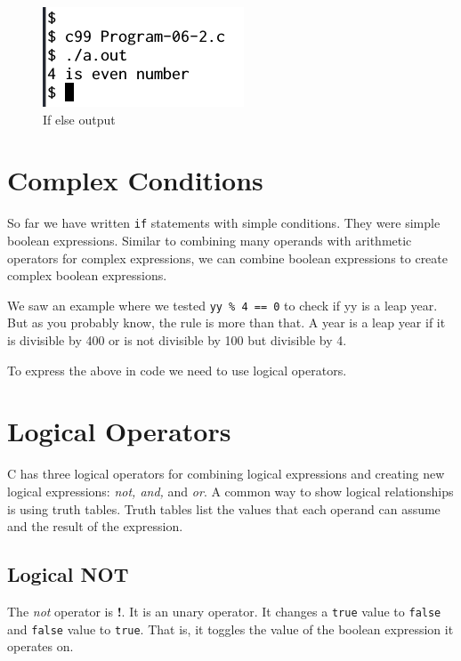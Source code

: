 \documentclass[11pt,a4paper]{article}
\begin{document}


\begin{figure}[ht]
\begin{center}
\includegraphics[scale = 0.6]{Output-06-2.png}
\caption{If else output}
\label{output-06-2}
\end{center}
\end{figure}

\section*{Complex Conditions}

So far we have written \lstinline!if! statements with simple conditions. They were simple boolean expressions. Similar to combining many operands with arithmetic operators for complex expressions, we can combine boolean expressions to create complex boolean expressions.

We saw an example where we tested \lstinline!yy % 4 == 0! to check if yy is a leap year. But as you probably know, the rule is more than that. A year is a leap year if it is divisible by 400 or is not divisible by 100 but divisible by 4.

To express the above in code we need to use logical operators. 

\section*{Logical Operators}
C has three logical operators for combining logical expressions and creating new logical expressions: \emph{not, and,} and \emph{or}. A common way to show logical relationships is using truth tables. Truth tables list the values that each operand can assume and the result of the expression.

\subsection*{Logical NOT}

The \emph{not} operator is \textbf{!}. It is an unary operator. It changes a \texttt{true} value to \texttt{false} and \texttt{false} value to \texttt{true}. That is, it toggles the value of the boolean expression it operates on.
\end{document}
